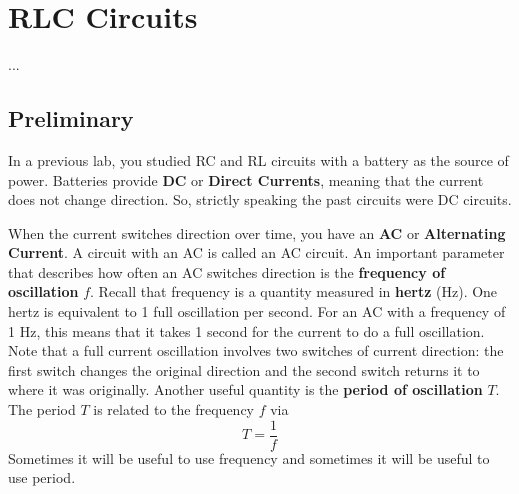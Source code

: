 \setcounter{chapter}{5}
\chapter{RLC Circuits}
...
\section{Preliminary}
In a previous lab, you studied RC and RL circuits with a battery as the source of power. Batteries provide \textbf{DC} or \textbf{Direct Currents}, meaning that the current does not change direction. So, strictly speaking the past circuits were DC circuits.

When the current switches direction over time, you have an \textbf{AC} or \textbf{Alternating Current}. A circuit with an AC is called an AC circuit. An important parameter that describes how often an AC switches direction is the \textbf{frequency of oscillation} $f$. Recall that frequency is a quantity measured in \textbf{hertz} (Hz). One hertz is equivalent to 1 full oscillation per second. For an AC with a frequency of 1 Hz, this means that it takes 1 second for the current to do a full oscillation. Note that a full current oscillation involves two switches of current direction: the first switch changes the original direction and the second switch returns it to where it was originally. Another useful quantity is the \textbf{period of oscillation} $T$. The period $T$ is related to the frequency $f$ via
\begin{equation} \label{eq.06.period}
	T = \frac{1}{f}
\end{equation}
Sometimes it will be useful to use frequency and sometimes it will be useful to use period.
